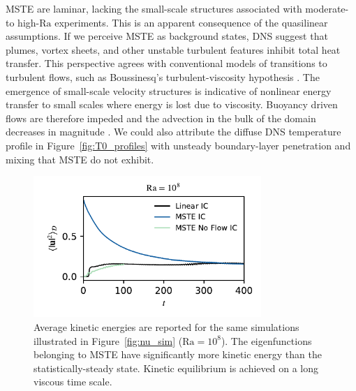 \documentclass[reprint,amsmath,amssymb,aps,nofootinbib]{revtex4-1}
\newcommand\Ra{\mathrm{Ra}}
\begin{document}
MSTE are laminar, lacking the small-scale structures associated with moderate- to high-$\Ra$ experiments. 
This is an apparent consequence of the quasilinear assumptions. 
If we perceive MSTE as background states, DNS suggest that plumes, vortex sheets, and other unstable turbulent features inhibit total heat transfer. 
This perspective agrees with conventional models of transitions to turbulent flows, such as Boussinesq's turbulent-viscosity hypothesis \cite{boussinesq_1877}. 
The emergence of small-scale velocity structures is indicative of nonlinear energy transfer to small scales where energy is lost due to viscosity. 
Buoyancy driven flows are therefore impeded and the advection in the bulk of the domain decreases in magnitude \cite{drazin_reid_2004, pope_2000}. 
We could also attribute the diffuse DNS temperature profile in Figure~\ref{fig:T0_profiles} with unsteady boundary-layer penetration and mixing that MSTE do not exhibit.

\begin{figure}
    \centering
    \includegraphics[width=3.4in]{sim_eq_ke_noflow.pdf}
    \caption{Average kinetic energies are reported for the same simulations illustrated in Figure~\ref{fig:nu_sim} ($\Ra = 10^8$). 
    The eigenfunctions belonging to MSTE have significantly more kinetic energy than the statistically-steady state. 
    Kinetic equilibrium is achieved on a long viscous time scale.}
    \label{fig:ke_sim}
\end{figure}
\end{document}
